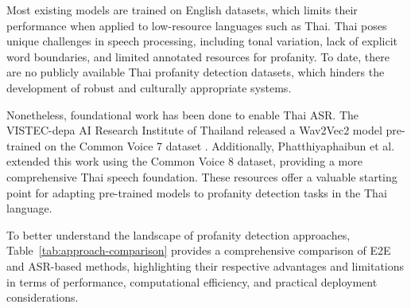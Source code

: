 \documentclass[11pt]{article}
\begin{document}
Most existing models are trained on English datasets, which limits their performance when applied to 
low-resource languages such as Thai. Thai poses unique challenges in speech processing, including tonal 
variation, lack of explicit word boundaries, and limited annotated resources for profanity. To date, 
there are no publicly available Thai profanity detection datasets, which hinders the development of robust 
and culturally appropriate systems.

Nonetheless, foundational work has been done to enable Thai ASR. The VISTEC-depa AI Research Institute of 
Thailand released a Wav2Vec2 model pre-trained on the Common Voice 7 dataset \cite{vistec-depa_ai_research_institute_of_thailand_2023}. 
Additionally, Phatthiyaphaibun et al. \cite{phatthiyaphaibun2022thai} extended this work using the Common 
Voice 8 dataset, providing a more comprehensive Thai speech foundation. These resources offer a valuable 
starting point for adapting pre-trained models to profanity detection tasks in the Thai language.

To better understand the landscape of profanity detection approaches, Table~\ref{tab:approach-comparison} provides a comprehensive comparison of E2E and ASR-based methods, highlighting their respective advantages and limitations in terms of performance, computational efficiency, and practical deployment considerations.
\end{document}
